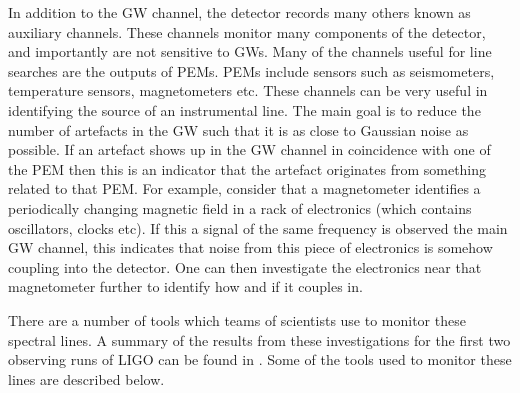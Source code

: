 %
In addition to the \gls{GW} channel, the detector
records many others known as auxiliary channels.  These channels
monitor many components of the detector, and importantly are not sensitive to
\glspl{GW}.  Many of the channels useful for line searches are the outputs of \glspl{PEM}.
\glspl{PEM} include sensors such as seismometers, temperature sensors,
magnetometers etc.  These channels can be very useful in identifying the source
of an instrumental line.  The main goal is to reduce the number of artefacts in
the \gls{GW} such that it is as close to Gaussian noise as possible.  If an
artefact shows up in the \gls{GW} channel in coincidence with one of the
\gls{PEM} then this is an indicator that the artefact originates from something
related to that \gls{PEM}.  For example, consider
that a magnetometer identifies a periodically changing magnetic field in a rack of electronics (which contains oscillators, clocks etc). If this a signal of the same frequency is observed the main \gls{GW} channel, this indicates that noise from this piece of electronics is somehow coupling into the detector.  One can then investigate the electronics near that magnetometer further to identify how and if it couples in.

%

There are a number of tools which teams of scientists use to monitor these spectral lines.
A summary of the results from these investigations for the first two observing runs of \gls{LIGO} can be found in
\citep{covas2018IdentificationMitigation}.  Some of the tools used to monitor these lines are
described below.

